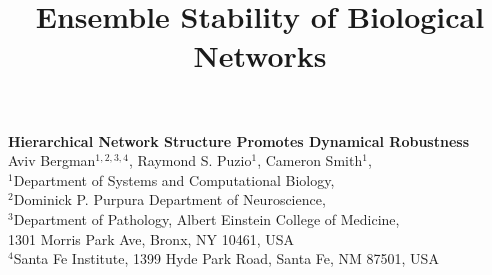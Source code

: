 



\let\ref\autoref

\title{Ensemble Stability of Biological Networks}


\begin{center}
{\Large
\textbf{Hierarchical Network Structure Promotes Dynamical Robustness}
}
\\[.5cm]
Aviv Bergman$^{1,2,3,4}$,
Raymond S. Puzio$^{1}$,
Cameron Smith$^{1}$,
\\[.5cm]
$^1$Department of Systems and Computational Biology,\\
$^2$Dominick P. Purpura Department of Neuroscience,\\
$^3$Department of Pathology, Albert Einstein College of Medicine,\\
1301 Morris Park Ave, Bronx, NY 10461, USA\\
$^4$Santa Fe Institute, 1399 Hyde Park Road, Santa Fe, NM 87501, USA
\\[.5cm]
\end{center}

{\begin{quote} \bf

\end{quote}}



